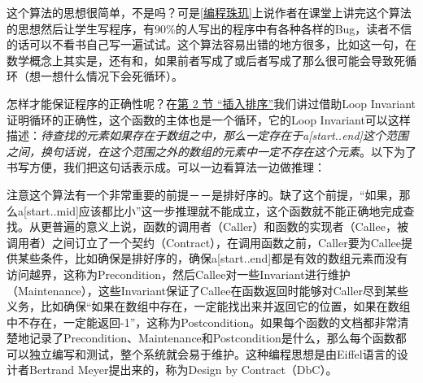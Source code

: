 这个算法的思想很简单，不是吗？可是\hyperlink{db.bi01.bibli.pearls}{[编程珠玑]}上说作者在课堂上讲完这个算法的思想然后让学生写程序，有90\%的人写出的程序中有各种各样的Bug，读者不信的话可以不看书自己写一遍试试。这个算法容易出错的地方很多，比如这一句，在数学概念上其实是，还有和，如果前者写成了或后者写成了那么很可能会导致死循环（想一想什么情况下会死循环）。



怎样才能保证程序的正确性呢？在\hyperlink{db.ch11s02.id2745253}{第 2 节 “插入排序”}我们讲过借助Loop Invariant证明循环的正确性，这个函数的主体也是一个循环，它的Loop Invariant可以这样描述：\emph{待查找的元素如果存在于数组之中，那么一定存在于a[start.\BookSplit{}.\BookSplit{}end]这个范围之间，换句话说，在这个范围之外的数组的元素中一定不存在这个元素}。以下为了书写方便，我们把这句话表示成。可以一边看算法一边做推理：




注意这个算法有一个非常重要的前提－－是排好序的。缺了这个前提，“如果，那么a[start.\BookSplit{}.\BookSplit{}mid]应该都比小”这一步推理就不能成立，这个函数就不能正确地完成查找。从更普遍的意义上说，函数的调用者（Caller）和函数的实现者（Callee，被调用者）之间订立了一个契约（Contract），在调用函数之前，Caller要为Callee提供某些条件，比如确保是排好序的，确保a[start.\BookSplit{}.\BookSplit{}end]都是有效的数组元素而没有访问越界，这称为Precondition，然后Callee对一些Invariant进行维护（Maintenance），这些Invariant保证了Callee在函数返回时能够对Caller尽到某些义务，比如确保“如果在数组中存在，一定能找出来并返回它的位置，如果在数组中不存在，一定能返回-1”，这称为Postcondition。如果每个函数的文档都非常清楚地记录了Precondition、Maintenance和Postcondition是什么，那么每个函数都可以独立编写和测试，整个系统就会易于维护。这种编程思想是由Eiffel语言的设计者Bertrand Meyer提出来的，称为Design by Contract（DbC）。



